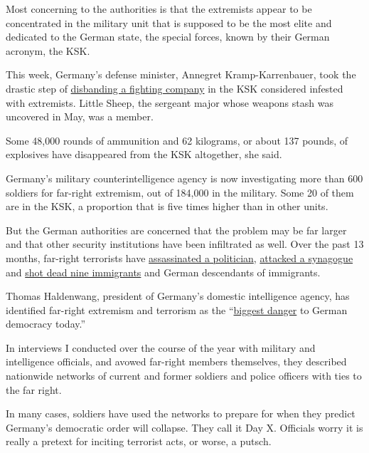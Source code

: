 Most concerning to the authorities is that the extremists appear to be
concentrated in the military unit that is supposed to be the most elite
and dedicated to the German state, the special forces, known by their
German acronym, the KSK.

This week, Germany's defense minister, Annegret Kramp-Karrenbauer, took
the drastic step of
\href{https://www.nytimes.com/2020/07/01/world/europe/german-special-forces-far-right.html}{disbanding
a fighting company} in the KSK considered infested with extremists.
Little Sheep, the sergeant major whose weapons stash was uncovered in
May, was a member.

Some 48,000 rounds of ammunition and 62 kilograms, or about 137 pounds,
of explosives have disappeared from the KSK altogether, she said.

Germany's military counterintelligence agency is now investigating more
than 600 soldiers for far-right extremism, out of 184,000 in the
military. Some 20 of them are in the KSK, a proportion that is five
times higher than in other units.

But the German authorities are concerned that the problem may be far
larger and that other security institutions have been infiltrated as
well. Over the past 13 months, far-right terrorists have
\href{https://www.nytimes.com/2019/06/17/world/europe/germany-terrorism-walter-lubcke.html}{assassinated
a politician},
\href{https://www.nytimes.com/2019/10/10/world/europe/germany-synagogue-attack.html?searchResultPosition=10}{attacked
a synagogue} and
\href{https://www.nytimes.com/2020/02/20/world/europe/germany-hanau-shisha-bar-shooting.html?searchResultPosition=28}{shot
dead nine immigrants} and German descendants of immigrants.

Thomas Haldenwang, president of Germany's domestic intelligence agency,
has identified far-right extremism and terrorism as the
``\href{https://www.nytimes.com/2020/02/21/world/europe/germany-shooting-terrorism.html?searchResultPosition=25}{biggest
danger} to German democracy today.''

In interviews I conducted over the course of the year with military and
intelligence officials, and avowed far-right members themselves, they
described nationwide networks of current and former soldiers and police
officers with ties to the far right.

In many cases, soldiers have used the networks to prepare for when they
predict Germany's democratic order will collapse. They call it Day X.
Officials worry it is really a pretext for inciting terrorist acts, or
worse, a putsch.

